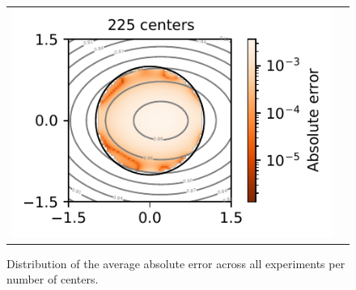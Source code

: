 \documentclass[12pt]{report} %
\begin{document}
\begin{figure}
\begin{tabular}{ccl}
    \multicolumn{2}{l}{\includegraphics[width=.4\textwidth, clip=true,trim={0 0 2.1cm 0}]{imagenes/experiments/2d/pde_runge_2d/runge_2d_225.pdf}} &
  \end{tabular}
  \caption{Distribution of the average absolute error across all experiments per number of centers.}
  \label{fig:runge-pde-2d-results-errors-avg}
\end{figure}





\clearpage


\printbibliography




\end{document}
